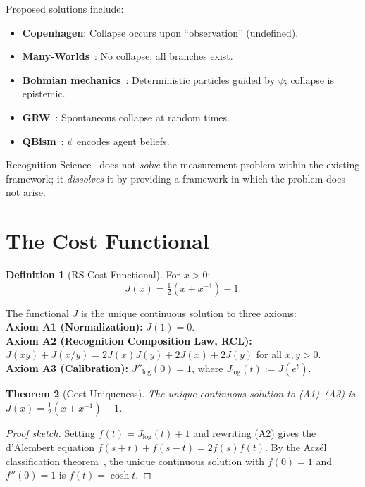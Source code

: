\documentclass[12pt,a4paper]{article}
\newtheorem{theorem}{Theorem}[section]
\theoremstyle{definition}
\newtheorem{definition}[theorem]{Definition}
\theoremstyle{remark}
\begin{document}
Proposed solutions include:
\begin{itemize}[nosep]
  \item \textbf{Copenhagen}: Collapse occurs upon ``observation''
  (undefined).
  \item \textbf{Many-Worlds}~\cite{Everett}: No collapse;
  all branches exist.
  \item \textbf{Bohmian mechanics}~\cite{Bohm}: Deterministic
  particles guided by $\psi$; collapse is epistemic.
  \item \textbf{GRW}~\cite{GRW}: Spontaneous collapse at random
  times.
  \item \textbf{QBism}~\cite{Fuchs}: $\psi$ encodes agent beliefs.
\end{itemize}

Recognition Science~\cite{RS_Axioms} does not \emph{solve} the
measurement problem within the existing framework; it \emph{dissolves}
it by providing a framework in which the problem does not arise.

\section{The Cost Functional}
\label{sec:cost}

\begin{definition}[RS Cost Functional]
For $x > 0$:
\begin{equation}
  J(x) = \tfrac{1}{2}(x + x^{-1}) - 1.
\end{equation}
\end{definition}

\noindent The functional $J$ is the unique continuous solution to
three axioms:\\
\textbf{Axiom A1 (Normalization):} $J(1) = 0$.\\
\textbf{Axiom A2 (Recognition Composition Law, RCL):}
$J(xy) + J(x/y) = 2J(x)J(y) + 2J(x) + 2J(y)$ for all $x, y > 0$.\\
\textbf{Axiom A3 (Calibration):} $J''_{\log}(0) = 1$, where
$J_{\log}(t) := J(e^t)$.

\begin{theorem}[Cost Uniqueness]
\label{thm:unique}
The unique continuous solution to \textup{(A1)--(A3)} is
$J(x) = \tfrac{1}{2}(x + x^{-1}) - 1$.
\end{theorem}

\begin{proof}[Proof sketch]
Setting $f(t) = J_{\log}(t) + 1$ and rewriting \textup{(A2)} gives the
d'Alembert equation $f(s+t) + f(s-t) = 2f(s)f(t)$.  By the Acz\'el
classification theorem~\cite{Aczel1966}, the unique continuous solution
with $f(0) = 1$ and $f''(0) = 1$ is $f(t) = \cosh t$.
\end{proof}
\end{document}
